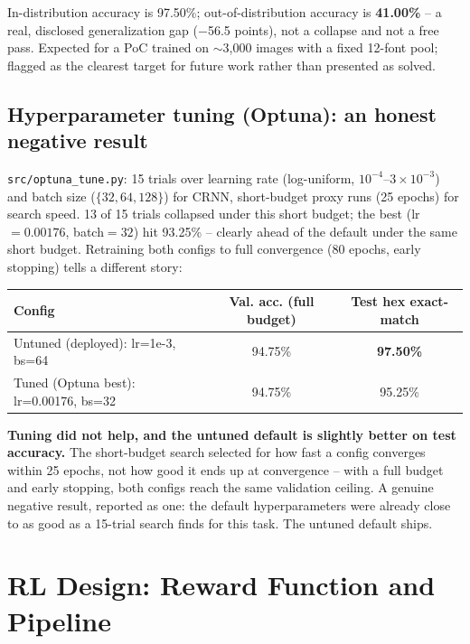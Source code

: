 \documentclass[11pt]{article}
\begin{document}
In-distribution accuracy is 97.50\%; out-of-distribution accuracy is \textbf{41.00\%}
-- a real, disclosed generalization gap ($-$56.5 points), not a collapse and not a
free pass. Expected for a PoC trained on $\sim$3,000 images with a fixed 12-font pool;
flagged as the clearest target for future work rather than presented as solved.

\subsection{Hyperparameter tuning (Optuna): an honest negative result}

\texttt{src/optuna\_tune.py}: 15 trials over learning rate (log-uniform,
$10^{-4}$--$3{\times}10^{-3}$) and batch size ($\{32,64,128\}$) for CRNN, short-budget
proxy runs (25 epochs) for search speed. 13 of 15 trials collapsed under this short
budget; the best (lr$=0.00176$, batch$=32$) hit 93.25\% -- clearly ahead of the
default under the same short budget. Retraining both configs to full convergence (80
epochs, early stopping) tells a different story:

\begin{table}[H]
\centering
\begin{tabular}{@{}lcc@{}}
\toprule
\textbf{Config} & \textbf{Val. acc. (full budget)} & \textbf{Test hex exact-match} \\
\midrule
Untuned (deployed): lr=1e-3, bs=64 & 94.75\% & \textbf{97.50\%} \\
Tuned (Optuna best): lr=0.00176, bs=32 & 94.75\% & 95.25\% \\
\bottomrule
\end{tabular}
\end{table}

\textbf{Tuning did not help, and the untuned default is slightly better on test
accuracy.} The short-budget search selected for how fast a config converges within 25
epochs, not how good it ends up at convergence -- with a full budget and early
stopping, both configs reach the same validation ceiling. A genuine negative result,
reported as one: the default hyperparameters were already close to as good as a
15-trial search finds for this task. The untuned default ships.

\section{RL Design: Reward Function and Pipeline}
\label{sec:rl}
\end{document}

